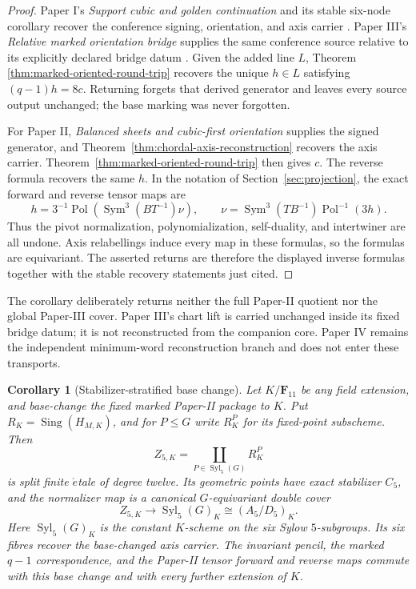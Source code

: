 \documentclass[11pt]{article}
\newtheorem{corollary}[theorem]{Corollary}
\theoremstyle{definition}
\theoremstyle{remark}
\newcommand{\F}{\mathbf F}
\newcommand{\Sym}{\operatorname{Sym}}
\newcommand{\Sing}{\operatorname{Sing}}
\begin{document}
\begin{proof}
Paper I's \emph{Support cubic and golden continuation} and its stable
six-node corollary recover the conference signing, orientation, and axis
carrier \cite{RuddRigidity2026}.  Paper III's
\emph{Relative marked orientation bridge} supplies the same conference
source relative to its explicitly declared bridge datum
\cite{RuddPassages2026}.  Given the added line \(L\), Theorem
\ref{thm:marked-oriented-round-trip} recovers the unique \(h\in L\) satisfying
\((q-1)h=8c\).  Returning forgets that derived generator and leaves every
source output unchanged; the base marking was never forgotten.

For Paper II, \emph{Balanced sheets and cubic-first orientation} supplies
the signed generator, and Theorem~\ref{thm:chordal-axis-reconstruction}
recovers the axis carrier.  Theorem~\ref{thm:marked-oriented-round-trip}
then gives \(c\).  The reverse formula recovers the same \(h\).  In the
notation of Section~\ref{sec:projection}, the exact forward and reverse
tensor maps are
\[
 h=3^{-1}\operatorname{Pol}\!\left(\Sym^3(BT^{-1})\nu\right),
 \qquad
 \nu=\Sym^3(TB^{-1})\operatorname{Pol}^{-1}(3h).
\]
Thus the pivot normalization, polynomialization, self-duality, and
intertwiner are all undone.  Axis relabellings induce every map in these
formulas, so the formulas are equivariant.  The asserted returns are
therefore the displayed inverse formulas together with the stable recovery
statements just cited.
\end{proof}

The corollary deliberately returns neither the full Paper-II quotient nor
the global Paper-III cover.  Paper III's chart lift is carried unchanged
inside its fixed bridge datum; it is not reconstructed from the companion
core.  Paper IV remains the independent minimum-word reconstruction branch
and does not enter these transports.

\begin{corollary}[Stabilizer-stratified base change]
\label{cor:stabilizer-stratified-base-change}
Let \(K/\F_{11}\) be any field extension, and base-change the fixed marked
Paper-II package to \(K\).  Put \(R_K=\Sing(H_{M,K})\), and for \(P\leq G\)
write \(R_K^P\) for its fixed-point subscheme.  Then
\[
 Z_{5,K}=\coprod_{P\in\operatorname{Syl}_5(G)}R_K^P
\]
is split finite \(\acute{e}\)tale of degree twelve.  Its geometric points
have exact stabilizer \(C_5\), and the normalizer map is a canonical
\(G\)-equivariant double cover
\[
 Z_{5,K}\longrightarrow
 \operatorname{Syl}_5(G)_K\cong(A_5/D_5)_K.
\]
Here \(\operatorname{Syl}_5(G)_K\) is the constant \(K\)-scheme on the six
Sylow \(5\)-subgroups.
Its six fibres recover the base-changed axis carrier.  The invariant pencil,
the marked \(q-1\) correspondence, and the Paper-II tensor forward and
reverse maps commute with this base change and with every further extension
of \(K\).
\end{corollary}
\end{document}
